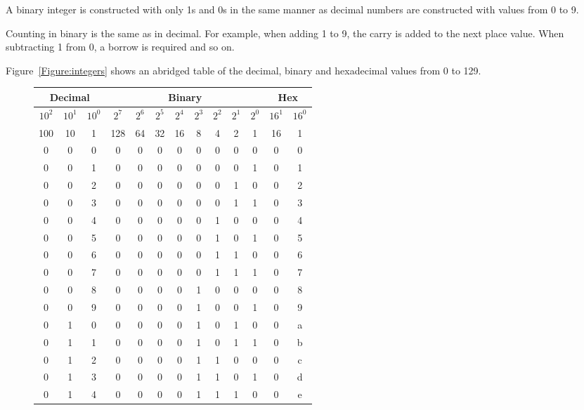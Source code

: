 A binary integer is constructed with only 1s and 0s in the same
manner as decimal numbers are constructed with values from 0 to 9.

Counting in binary is the same as in decimal.  For example, when
adding 1 to 9, the carry is added to the next place value.  When
subtracting 1 from 0, a borrow is required and so on.

Figure~\autoref{Figure:integers} shows an abridged table of the 
decimal, binary and hexadecimal values from 0 to 129.

\begin{figure}[ht]
\begin{center}
\begin{tabular}{|c|c|c||c|c|c|c|c|c|c|c||c|c|}
\hline
\multicolumn{3}{|c||}{Decimal} & \multicolumn{8}{|c||}{Binary} & \multicolumn{2}{|c|}{Hex}\\
\hline
$10^2$	& $10^1$	& $10^0$	& $2^7$ & $2^6$ & $2^5$ & $2^4$ & $2^3$ & $2^2$ & $2^1$ & $2^0$		& $16^1$ & $16^0$	\\
\hline
100		&	10		& 1			& 128	& 64	& 32	& 16	& 8		& 4		& 2		& 1			& 16	& 1			\\
\hline \hline
0		&	0		&	0		& 0 & 0 & 0 & 0 & 0 & 0 & 0 & 0		& 0 & 0 \\
0		&	0		&	1		& 0 & 0 & 0 & 0 & 0 & 0 & 0 & 1		& 0 & 1 \\
0		&	0		&	2		& 0 & 0 & 0 & 0 & 0 & 0 & 1 & 0		& 0 & 2 \\
0		&	0		&	3		& 0 & 0 & 0 & 0 & 0 & 0 & 1 & 1		& 0 & 3 \\
0		&	0		&	4		& 0 & 0 & 0 & 0 & 0 & 1 & 0 & 0		& 0 & 4 \\
0		&	0		&	5		& 0 & 0 & 0 & 0 & 0 & 1 & 0 & 1		& 0 & 5 \\
0		&	0		&	6		& 0 & 0 & 0 & 0 & 0 & 1 & 1 & 0		& 0 & 6 \\
0		&	0		&	7		& 0 & 0 & 0 & 0 & 0 & 1 & 1 & 1		& 0 & 7 \\
0		&	0		&	8		& 0 & 0 & 0 & 0 & 1 & 0 & 0 & 0		& 0 & 8 \\
0		&	0		&	9		& 0 & 0 & 0 & 0 & 1 & 0 & 0 & 1		& 0 & 9 \\
0		&	1		&	0		& 0 & 0 & 0 & 0 & 1 & 0 & 1 & 0		& 0 & a \\
0		&	1		&	1		& 0 & 0 & 0 & 0 & 1 & 0 & 1 & 1		& 0 & b \\
0		&	1		&	2		& 0 & 0 & 0 & 0 & 1 & 1 & 0 & 0		& 0 & c \\
0		&	1		&	3		& 0 & 0 & 0 & 0 & 1 & 1 & 0 & 1		& 0 & d \\
0		&	1		&	4		& 0 & 0 & 0 & 0 & 1 & 1 & 1 & 0		& 0 & e \\

\end{tabular}
\end{center}
\end{figure}
